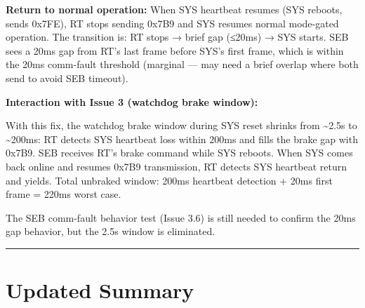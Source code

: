 \documentclass[12pt,a4paper,oneside]{report}
\begin{document}
\textbf{Return to normal operation:} When SYS heartbeat resumes (SYS reboots,
sends 0x7FE), RT stops sending 0x7B9 and SYS resumes normal mode-gated
operation. The transition is: RT stops → brief gap (≤20ms) → SYS starts. SEB
sees a 20ms gap from RT's last frame before SYS's first frame, which is within
the 20ms comm-fault threshold (marginal --- may need a brief overlap where both
send to avoid SEB timeout).

\textbf{Interaction with Issue 3 (watchdog brake window):}

With this fix, the watchdog brake window during SYS reset shrinks from
\textasciitilde2.5s to \textasciitilde200ms: RT detects SYS heartbeat loss
within 200ms and fills the brake gap with 0x7B9. SEB receives RT's brake command
while SYS reboots. When SYS comes back online and resumes 0x7B9 transmission, RT
detects SYS heartbeat return and yields. Total unbraked window: 200ms heartbeat
detection + 20ms first frame = 220ms worst case.

The SEB comm-fault behavior test (Issue 3.6) is still needed to confirm the 20ms
gap behavior, but the 2.5s window is eliminated.

\begin{center}\rule{0.5\linewidth}{0.5pt}\end{center}

\section{Updated Summary}\label{updated-summary}
\end{document}

